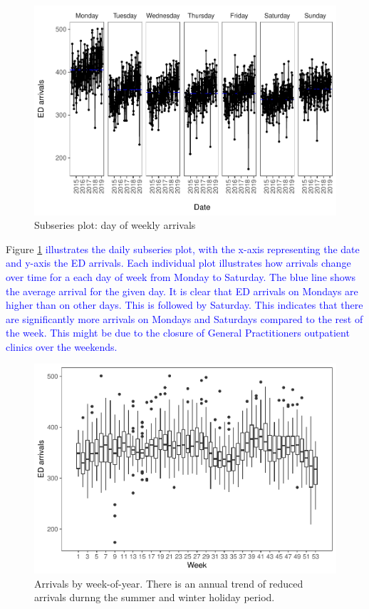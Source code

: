 \documentclass[]{elsarticle} %
\begin{document}
\begin{figure}[H]

{\centering \includegraphics[width=0.7\linewidth]{paper_files/figure-latex/seasonplot-dofw-1} 

}

\caption{Subseries plot: day of weekly arrivals}\label{fig:seasonplot-dofw}
\end{figure}

Figure \ref{fig:seasonplot-dofw} \textcolor{blue}{ illustrates the daily subseries plot, with the x-axis representing the date and y-axis
the ED arrivals. Each individual plot illustrates how arrivals change over time for a each day
of week from Monday to Saturday. The blue line shows the average arrival for the given day.
It is clear that ED arrivals on Mondays are higher than on other days. This is followed by
Saturday. This indicates that there are significantly more arrivals on Mondays and Saturdays
compared to the rest of the week. This might be due to the closure of General Practitioners
outpatient clinics over the weekends.}

\begin{figure}[H]

{\centering \includegraphics[width=0.7\linewidth]{paper_files/figure-latex/seasonplot-weekofyear-1} 

}

\caption{Arrivals by week-of-year. There is an annual trend of reduced arrivals durnng the summer and winter holiday period.}\label{fig:seasonplot-weekofyear}
\end{figure}
\end{document}
